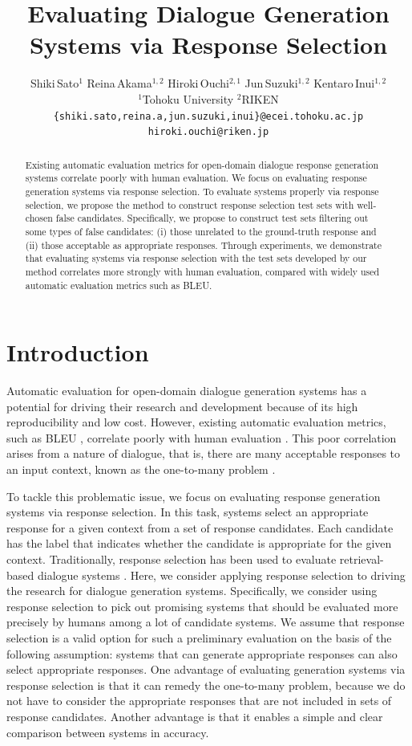 \documentclass[11pt,a4paper]{article}
\title{Evaluating Dialogue Generation Systems via Response Selection}
\author{
Shiki\,Sato$^{1}$\hspace{1em}
Reina\,Akama$^{1,2}$\hspace{1em}
Hiroki\,Ouchi$^{2,1}$\hspace{1em}
Jun\,Suzuki$^{1,2}$\hspace{1em}
Kentaro\,Inui$^{1,2}$\\[2pt]
$^{1}$Tohoku University\hspace{1em}
$^{2}$RIKEN\hspace{1em}
\\
\texttt{\{shiki.sato,reina.a,jun.suzuki,inui\}@ecei.tohoku.ac.jp}
\\
\texttt{hiroki.ouchi@riken.jp}
}
\date{}
\begin{document}
\maketitle
\begin{abstract}
Existing automatic evaluation metrics for open-domain dialogue response generation systems correlate poorly with human evaluation. 
%
We focus on evaluating response generation systems via response selection.
To evaluate systems properly via response selection, we propose the method to construct response selection test sets with well-chosen false candidates.
Specifically, we propose to construct test sets filtering out some types of false candidates: (i) those unrelated to the ground-truth response and (ii) those acceptable as appropriate responses.
Through experiments, we demonstrate that evaluating systems via response selection with the test sets developed by our method correlates more strongly with human evaluation, compared with widely used automatic evaluation metrics such as BLEU.
\end{abstract}

%

\section{Introduction}
\label{sec:introduction}
Automatic evaluation for open-domain dialogue generation systems has a potential for driving their research and development because of its high reproducibility and low cost.
However, existing automatic evaluation metrics, such as BLEU \cite{papineni-etal-2002-bleu}, correlate poorly with human evaluation \cite{liu-etal-2016-evaluate}.
This poor correlation arises from a nature of dialogue, that is, there are many acceptable responses to an input context, known as the one-to-many problem \cite{zhao-etal-2017-learning}.

To tackle this problematic issue, we focus on evaluating response generation systems via response selection.
In this task, systems select an appropriate response for a given context from a set of response candidates.
Each candidate has the label that indicates whether the candidate is appropriate for the given context.
Traditionally, response selection has been used to evaluate retrieval-based dialogue systems \cite{lowe-etal-2015-ubuntu,wu-etal-2017-sequential}.
Here, we consider applying response selection to driving the research for dialogue generation systems.
Specifically, we consider using response selection to pick out promising systems that should be evaluated more precisely by humans among a lot of candidate systems.
%
%
We assume that response selection is a valid option for such a preliminary evaluation on the basis of the following assumption: systems that can generate appropriate responses can also select appropriate responses.
One advantage of evaluating generation systems via response selection is that it can remedy the one-to-many problem, because we do not have to consider the appropriate responses that are not included in sets of response candidates.
%
Another advantage is that it enables a simple and clear comparison between systems in accuracy.
%
%
%
\end{document}
